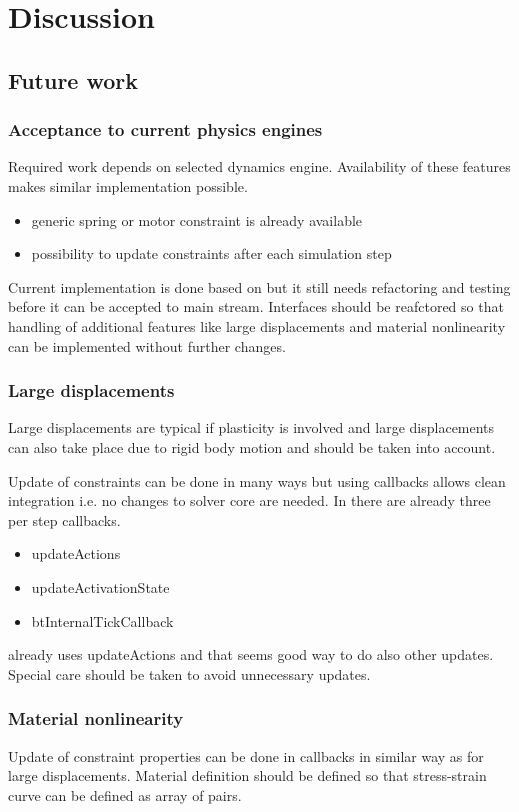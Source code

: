 \section{Discussion}

\subsection{Future work}
\label{subsec:futureWork}

\subsubsection{Acceptance to current physics engines}

Required work depends on selected dynamics engine. Availability of these features makes similar 
implementation possible.

\begin{itemize}
\item generic spring or motor constraint is already available 
\item possibility to update constraints after each simulation step
\end{itemize}

Current implementation is done based on \bullet but it still needs refactoring and testing before it can be 
accepted to main stream. Interfaces should be reafctored so that handling of additional features like large 
displacements and material nonlinearity can be implemented without further changes.

\subsubsection{Large displacements}
Large displacements are typical if plasticity is involved and
large displacements can also take place due to rigid body motion and should be taken into account.

Update of constraints can be done in  many ways but using callbacks allows clean integration i.e. no changes
to solver core are needed.
In \bullet there are already three per step callbacks. 

\begin{itemize}
\item updateActions
\item updateActivationState
\item btInternalTickCallback
\end{itemize}

\demolisher already uses updateActions and that seems 
good way to do also other updates. Special care should be taken to avoid unnecessary updates.


\subsubsection{Material nonlinearity}
Update of constraint properties can be done in callbacks in similar way as for large displacements.
Material definition should be defined so that stress-strain curve can be defined as array of pairs.

\cleardoublepage
